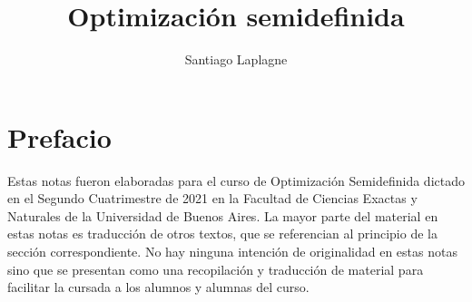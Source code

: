 \documentclass{book}
\title{}
\date{}
\title{Optimizaci\'on semidefinida}
\author{Santiago Laplagne}
\theoremstyle{plain}
\theoremstyle{definition}
\begin{document}
\maketitle

\tableofcontents

%


\chapter*{Prefacio}
Estas notas fueron elaboradas para el curso de Optimización Semidefinida dictado en el Segundo Cuatrimestre de 2021 en la Facultad de Ciencias Exactas y Naturales de la Universidad de Buenos Aires. La mayor parte del material en estas notas es traducción de otros textos, que se referencian al principio de la sección correspondiente. No hay ninguna intención de originalidad en estas notas sino que se presentan como una recopilación y traducción de material para facilitar la cursada a los alumnos y alumnas del curso.










\end{document}

